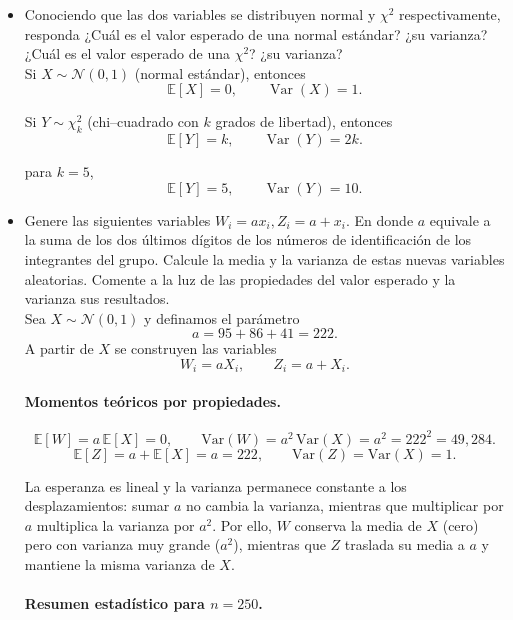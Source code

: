 \documentclass[12pt]{article}
\begin{document}
\begin{itemize}
    \item Conociendo que las dos variables se distribuyen normal y $\chi^2$ respectivamente, responda ¿Cuál es el valor esperado de una normal estándar? ¿su varianza? ¿Cuál es el valor esperado de una $\chi^2$? ¿su varianza?\\

    Si \(X \sim \mathcal{N}(0,1)\) (normal estándar), entonces
    \[
    \mathbb{E}[X]=0, 
    \qquad 
    \operatorname{Var}(X)=1.
    \]
    
    Si \(Y \sim \chi^{2}_{k}\) (chi–cuadrado con \(k\) grados de libertad), entonces
    \[
    \mathbb{E}[Y]=k, 
    \qquad 
    \operatorname{Var}(Y)=2k.
    \]
    
    \noindent para \(k=5\),
    \[
    \mathbb{E}[Y]=5, 
    \qquad 
    \operatorname{Var}(Y)=10.
    \]

    \item 	Genere las siguientes variables $W_i=ax_i, Z_i=a+x_i$. En donde $a$ equivale a la suma de los dos últimos dígitos de los números de identificación de los integrantes del grupo. Calcule la media y la varianza de estas nuevas variables aleatorias. Comente a la luz de las propiedades del valor esperado y la varianza sus resultados.\\

    Sea $X\sim\mathcal N(0,1)$ y definamos el parámetro
    \[
    a = 95+86+41 = 222.
    \]
    A partir de $X$ se construyen las variables
    \[
    W_i = aX_i, 
    \qquad 
    Z_i = a+X_i.
    \]
    
    \paragraph{Momentos teóricos por propiedades.}
    \[
    \mathbb E[W] = a\,\mathbb E[X] = 0, 
    \qquad 
    \mathrm{Var}(W) = a^2\,\mathrm{Var}(X) = a^2 = 222^2 = 49{,}284.
    \]
    \[
    \mathbb E[Z] = a + \mathbb E[X] = a = 222, 
    \qquad 
    \mathrm{Var}(Z) = \mathrm{Var}(X) = 1.
    \]
    
    La esperanza es lineal y la varianza permanece constante a los desplazamientos: 
    sumar $a$ no cambia la varianza, mientras que multiplicar por $a$ multiplica la varianza por $a^2$. 
    Por ello, $W$ conserva la media de $X$ (cero) pero con varianza muy grande ($a^2$), 
    mientras que $Z$ traslada su media a $a$ y mantiene la misma varianza de $X$.
    
    \paragraph{Resumen estadístico para $n=250$.}
    

\end{itemize}
\end{document}
